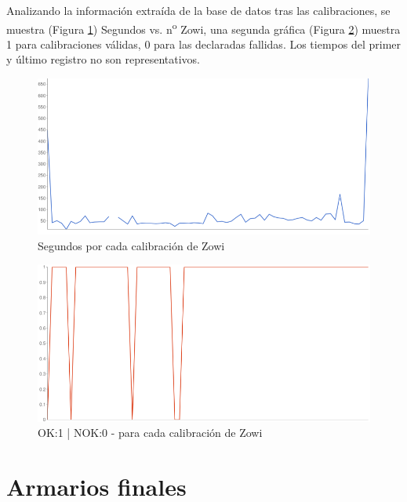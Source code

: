 Analizando la información extraída de la base de datos tras las calibraciones, se muestra (Figura \ref{fig:tiempos}) Segundos vs. n\textsuperscript{o} Zowi, una segunda gráfica (Figura \ref{fig:ok-nok}) muestra 1 para calibraciones válidas, 0 para las declaradas fallidas. Los tiempos del primer y último registro no son representativos.

\begin{figure}
\centering
\includegraphics[width=140mm]{Figures/tiempos}
\caption{Segundos por cada calibración de Zowi}
\label{fig:tiempos}
\end{figure}

\begin{figure}
\centering
\includegraphics[width=140mm]{Figures/ok-nok}
\caption{OK:1 | NOK:0 - para cada calibración de Zowi}
\label{fig:ok-nok}
\end{figure}


\section{Armarios finales}


